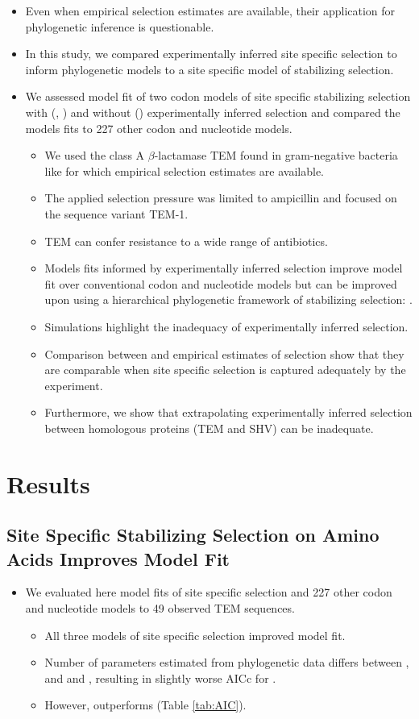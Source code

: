 \documentclass[12pt]{article}
\begin{document}
\begin{itemize}
	\item Even when empirical selection estimates are available, their application for phylogenetic inference is questionable.
	\item In this study, we compared experimentally inferred site specific selection to inform phylogenetic models to a site specific model of stabilizing selection.
	\item We assessed model fit of two codon models of site specific stabilizing selection with (\selacDMS, \phydms) and without (\selac) experimentally inferred selection and compared the models fits to 227 other codon and nucleotide models.
	\begin{itemize}
		\item We used the class A $\beta$-lactamase TEM found in gram-negative bacteria like \ecoli for which empirical selection estimates are available.  
		\item The applied selection pressure was limited to ampicillin and focused on the sequence variant TEM-1.
		\item TEM can confer resistance to a wide range of antibiotics.
		\item Models fits informed by experimentally inferred selection improve model fit over conventional codon and nucleotide models but can be improved upon using a hierarchical phylogenetic framework of stabilizing selection: \selac.
		\item Simulations highlight the inadequacy of experimentally inferred selection.
		\item Comparison between \selac and empirical estimates of selection show that they are comparable when site specific selection is captured adequately by the experiment.
		\item Furthermore, we show that extrapolating experimentally inferred selection between homologous proteins (TEM and SHV) can be inadequate.
	\end{itemize}
\end{itemize}

\section*{Results}
\subsection*{Site Specific Stabilizing Selection on Amino Acids Improves Model Fit}
\begin{itemize}
	\item We evaluated here model fits of site specific selection and 227 other codon and nucleotide models to 49 observed TEM sequences.
	\begin{itemize}
		\item All three models of site specific selection improved model fit.
		\item Number of parameters estimated from phylogenetic data differs between \selac, and \selacDMS and \phydms, resulting in slightly worse AICc for \selac.
		\item However, \selac outperforms \phydms (Table \ref{tab:AIC}).
	\end{itemize}
\end{itemize}
\end{document}
